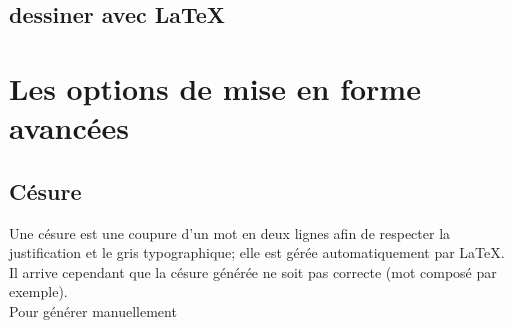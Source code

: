 \documentclass[a4paper, 10pt]{book}
\begin{document}
\listoffigures

\section{dessiner avec LaTeX}

\chapter{Les options de mise en forme avancées}
\section{Césure}
Une césure est une coupure d'un mot en deux lignes afin de respecter la justification et le gris typographique; elle est gérée automatiquement par \LaTeX. Il arrive cependant que la césure générée ne soit pas correcte (mot composé par exemple). \\
Pour générer manuellement 

\backmatter




\tableofcontents
\end{document}

